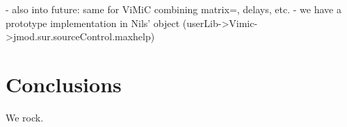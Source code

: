 \documentclass[twoside,a4paper]{article}
\begin{document}
        - also into future: same for ViMiC combining matrix=, delays, etc.
        - we have a prototype implementation in Nils' object (userLib->Vimic->jmod.sur.sourceControl.maxhelp)





%
\section{Conclusions} %
%

We rock.







%
%




\end{document}
